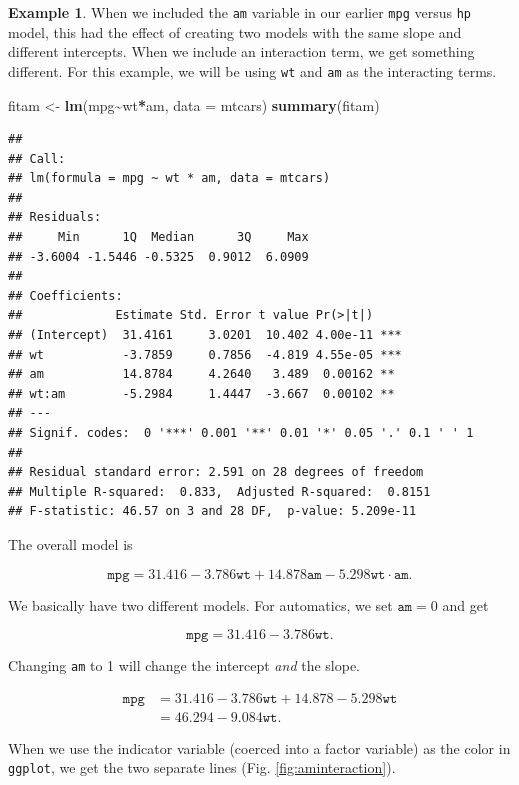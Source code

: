 \documentclass[
]{book}
\newenvironment{Shaded}{\begin{snugshade}}{\end{snugshade}}
\newcommand{\AttributeTok}[1]{\textcolor[rgb]{0.13,0.29,0.53}{#1}}
\newcommand{\FunctionTok}[1]{\textcolor[rgb]{0.13,0.29,0.53}{\textbf{#1}}}
\newcommand{\NormalTok}[1]{#1}
\newcommand{\OtherTok}[1]{\textcolor[rgb]{0.56,0.35,0.01}{#1}}
\newcommand{\SpecialCharTok}[1]{\textcolor[rgb]{0.81,0.36,0.00}{\textbf{#1}}}
\theoremstyle{definition}
\theoremstyle{definition}
\newtheorem{example}{Example}[chapter]
\theoremstyle{definition}
\theoremstyle{definition}
\theoremstyle{remark}
\begin{document}
\begin{examplebox}

\begin{example}
When we included the \texttt{am} variable in our earlier \texttt{mpg} versus \texttt{hp} model, this had the effect of creating two models with the same slope and different intercepts. When we include an interaction term, we get something different. For this example, we will be using \texttt{wt} and \texttt{am} as the interacting terms.

\begin{Shaded}
\begin{Highlighting}[]
\NormalTok{fitam }\OtherTok{\textless{}{-}} \FunctionTok{lm}\NormalTok{(mpg}\SpecialCharTok{\textasciitilde{}}\NormalTok{wt}\SpecialCharTok{*}\NormalTok{am, }\AttributeTok{data =}\NormalTok{ mtcars)}
\FunctionTok{summary}\NormalTok{(fitam)}
\end{Highlighting}
\end{Shaded}

\begin{verbatim}
## 
## Call:
## lm(formula = mpg ~ wt * am, data = mtcars)
## 
## Residuals:
##     Min      1Q  Median      3Q     Max 
## -3.6004 -1.5446 -0.5325  0.9012  6.0909 
## 
## Coefficients:
##             Estimate Std. Error t value Pr(>|t|)    
## (Intercept)  31.4161     3.0201  10.402 4.00e-11 ***
## wt           -3.7859     0.7856  -4.819 4.55e-05 ***
## am           14.8784     4.2640   3.489  0.00162 ** 
## wt:am        -5.2984     1.4447  -3.667  0.00102 ** 
## ---
## Signif. codes:  0 '***' 0.001 '**' 0.01 '*' 0.05 '.' 0.1 ' ' 1
## 
## Residual standard error: 2.591 on 28 degrees of freedom
## Multiple R-squared:  0.833,  Adjusted R-squared:  0.8151 
## F-statistic: 46.57 on 3 and 28 DF,  p-value: 5.209e-11
\end{verbatim}

The overall model is

\[\texttt{mpg}=31.416-3.786\texttt{wt}+14.878\texttt{am}-5.298\texttt{wt}\cdot \texttt{am}.\]

We basically have two different models. For automatics, we set \(\texttt{am}=0\) and get

\[\texttt{mpg}=31.416-3.786\texttt{wt}.\]

Changing \texttt{am} to 1 will change the intercept \emph{and} the slope.

\begin{align*}
\texttt{mpg}&=31.416-3.786\texttt{wt}+14.878-5.298\texttt{wt} \\
    &=46.294-9.084\texttt{wt}.
\end{align*}

When we use the indicator variable (coerced into a factor variable) as the color in \texttt{ggplot}, we get the two separate lines (Fig. \ref{fig:aminteraction}).
\end{example}

\end{examplebox}
\end{document}
